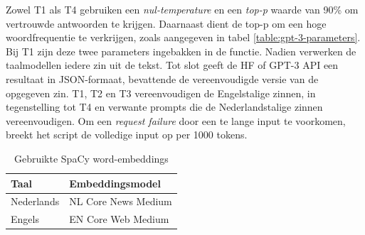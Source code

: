 Zowel T1 als T4 gebruiken een \textit{nul-temperature} en een \textit{top-p} waarde van 90\% om vertrouwde antwoorden te krijgen. Daarnaast dient de top-p om een hoge woordfrequentie te verkrijgen, zoals aangegeven in tabel \ref{table:gpt-3-parameters}. Bij T1 zijn deze twee parameters ingebakken in de functie. Nadien verwerken de taalmodellen iedere zin uit de tekst. Tot slot geeft de HF of GPT-3 API een resultaat in JSON-formaat, bevattende de vereenvoudigde versie van de opgegeven zin. T1, T2 en T3 vereenvoudigen de Engelstalige zinnen, in tegenstelling tot T4 en verwante prompts die de Nederlandstalige zinnen vereenvoudigen. Om een \textit{request failure} door een te lange input te voorkomen, breekt het script de volledige input op per 1000 tokens.

\begin{center}
	\begin{table}[H]
		\begin{tabular}{ | m{7cm} | m{7cm} | } 
			\hline
			\textbf{Taal} & \textbf{Embeddingsmodel} \\
			\hline
			Nederlands & NL Core News Medium \\ 
			\hline
			Engels & EN Core Web Medium \\
			\hline
		\end{tabular}
		\caption{Gebruikte SpaCy word-embeddings}
		\label{table:wordembeddings-spacy}
	\end{table}
\end{center}

\newpage

